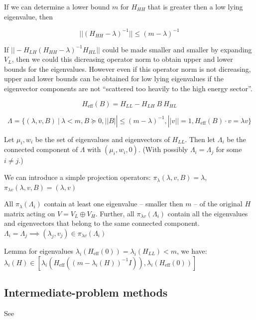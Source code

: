 \documentclass{article}
\theoremstyle{definition}
\begin{document}
If we can determine a lower bound $m$ for $H_{HH}$ that is greater then a low lying eigenvalue, then 

\begin{equation}
    ||(H_{HH}-\lambda)^{-1}||\le (m-\lambda)^{-1}
\end{equation}

If $||-H_{L H} (H_{HH}-\lambda)^{-1} H_{HL}||$ could be made smaller and smaller by expanding $V_L$, then we could this dicreasing operator norm to obtain upper and lower bounds for the eigenvalues.
However even if this operator norm is not dicreasing, upper and lower bounds can be obtained for low lying eigenvalues if the eigenvector components are not ``scattered too heavily to the high energy sector''.

\begin{equation}
    H_\text{eff}(B) = 
    H_{LL} - H_{L H} \ B \  H_{HL}
\end{equation}

\begin{equation}
    \Lambda = \{ (\lambda,v,B) \ | \ \lambda < m, B \succcurlyeq 0  , || B || \le (m-\lambda)^{-1}, ||v||=1, H_\text{eff}(B) \cdot v = \lambda v \}
\end{equation}

Let $\mu_i, w_i$ be the set of eigenvalues and eigenvectors of $H_{LL}$. Then let $\Lambda_i$ be the connected component of $\Lambda$ with $(\mu_i,w_i,0)$. (With possibly $\Lambda_i=\Lambda_j$ for some $i\ne j$.)

We can introduce a simple projection operators: $\pi_\lambda (\lambda,v,B) = \lambda$, $\pi_{\lambda v} (\lambda,v,B) = (\lambda,v)$

All $\pi_\lambda(\Lambda_i)$ contain at least one eigenvalue -- smaller then $m$ -- of the original $H$ matrix acting on $V=V_L \oplus V_H$.
Further, all $\pi_{\lambda v}(\Lambda_i)$ contain all the eigenvalues and eigenvectors that belong to the same connected component.
$\Lambda_i=\Lambda_j \implies (\lambda_j,v_j) \in \pi_{\lambda v}(\Lambda_i)$

Lemma for eigenvalues $\lambda_i(H_\text{eff}(0))=\lambda_i(H_{LL}) < m$, we have: $\lambda_i(H) \in [\lambda_i(H_\text{eff}((m-\lambda_i(H))^{-1} I)),\lambda_i(H_\text{eff}(0))]$

\subsection{Intermediate-problem methods}

See \cite{paper:Aronszajn1948,paper:BazleyFox1961Truncations,paper:BazleyFox1962BstarB,paper:FoxRheinboldt1966,paper:Brown1988}
\end{document}
